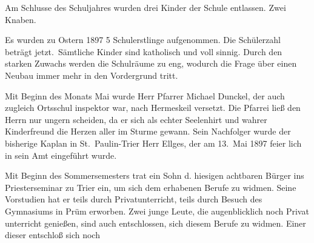 

Am Schlusse des Schuljahres wurden drei Kinder\ob
der Schule entlassen. Zwei Knaben.

\pend
{}
\pstart

Es wurden zu Ostern 1897 5 Schulerstlinge\ob
aufgenommen. Die Schülerzahl beträgt jetzt.\ Sämtliche Kinder sind katholisch und voll\ohb
sinnig. Durch den starken Zuwachs werden die\ob
Schulräume zu eng, wodurch die Frage über einen\ob
Neubau immer mehr in den Vordergrund tritt.

\pend
{}
\pstart

Mit Beginn des Monats Mai wurde Herr Pfarrer\ob
Michael Dunckel, der auch zugleich Ortsschul\ohb
inspektor war, nach Hermeskeil versetzt. Die Pfarrei ließ den\ob
Herrn nur ungern scheiden, da er sich als echter\ob
Seelenhirt und wahrer Kinderfreund die Herzen\ob
aller im Sturme gewann. Sein Nachfolger\ob
wurde der bisherige Kaplan in St.\ Paulin-Trier\ob
Herr Ellges, der am 13.\ Mai 1897 feier\ohb
lich in sein Amt eingeführt wurde.

Mit Beginn des Sommersemesters trat ein Sohn d.\ob
hiesigen achtbaren Bürger ins Priesterseminar zu Trier\ob
ein, um sich dem erhabenen Berufe zu widmen.\ob
Seine Vorstudien hat er teils durch Privatunterricht,\ob
teils durch Besuch des Gymnasiums in Prüm erworben.\ob
Zwei junge Leute, die augenblicklich noch Privat\ohb
unterricht genießen, sind auch entschlossen, sich\ob
diesem Berufe zu widmen. Einer dieser entschloß sich noch
\pend
